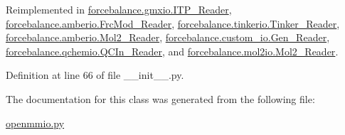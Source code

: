 \-Reimplemented in \hyperlink{classforcebalance_1_1gmxio_1_1ITP__Reader_ab35c32e7ecf74028641613f90906bd37}{forcebalance.\-gmxio.\-I\-T\-P\-\_\-\-Reader}, \hyperlink{classforcebalance_1_1amberio_1_1FrcMod__Reader_ad25c7e07aadb587268f3beb7a379766c}{forcebalance.\-amberio.\-Frc\-Mod\-\_\-\-Reader}, \hyperlink{classforcebalance_1_1tinkerio_1_1Tinker__Reader_a7078ca5338dff178edf5afb05a1f32c8}{forcebalance.\-tinkerio.\-Tinker\-\_\-\-Reader}, \hyperlink{classforcebalance_1_1amberio_1_1Mol2__Reader_a76b4f0ec6731d7072da6be5768ebf979}{forcebalance.\-amberio.\-Mol2\-\_\-\-Reader}, \hyperlink{classforcebalance_1_1custom__io_1_1Gen__Reader_a408f5717e02bcc0d87b8e60bd8b0714e}{forcebalance.\-custom\-\_\-io.\-Gen\-\_\-\-Reader}, \hyperlink{classforcebalance_1_1qchemio_1_1QCIn__Reader_a1ff6018724f2760bb6dd32dd3c854328}{forcebalance.\-qchemio.\-Q\-C\-In\-\_\-\-Reader}, and \hyperlink{classforcebalance_1_1mol2io_1_1Mol2__Reader_a39adb792b05aab536e3376ecf2ec5778}{forcebalance.\-mol2io.\-Mol2\-\_\-\-Reader}.



\-Definition at line 66 of file \-\_\-\-\_\-init\-\_\-\-\_\-.\-py.



\-The documentation for this class was generated from the following file\-:\begin{DoxyCompactItemize}
\item 
\hyperlink{openmmio_8py}{openmmio.\-py}\end{DoxyCompactItemize}
